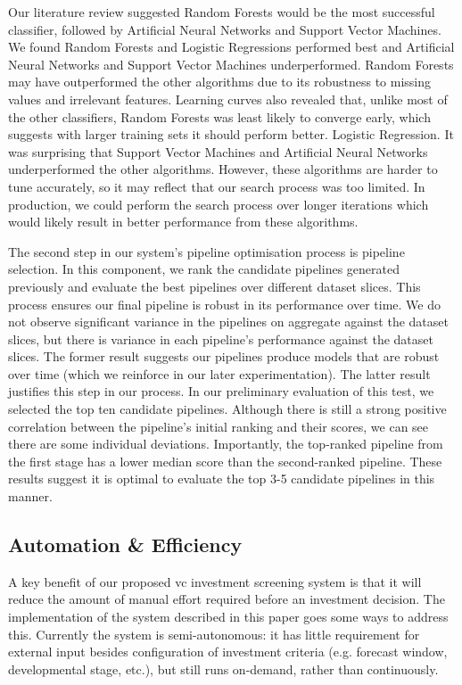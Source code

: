 \documentclass[../thesis/thesis.tex]{subfiles}
\begin{document}
Our literature review suggested Random Forests would be the most successful classifier, followed by Artificial Neural Networks and Support Vector Machines. We found Random Forests and Logistic Regressions performed best and Artificial Neural Networks and Support Vector Machines underperformed. Random Forests may have outperformed the other algorithms due to its robustness to missing values and irrelevant features. Learning curves also revealed that, unlike most of the other classifiers, Random Forests was least likely to converge early, which suggests with larger training sets it should perform better. Logistic Regression. It was surprising that Support Vector Machines and Artificial Neural Networks underperformed the other algorithms. However, these algorithms are harder to tune accurately, so it may reflect that our search process was too limited. In production, we could perform the search process over longer iterations which would likely result in better performance from these algorithms.

The second step in our system's pipeline optimisation process is pipeline selection. In this component, we rank the candidate pipelines generated previously and evaluate the best pipelines over different dataset slices. This process ensures our final pipeline is robust in its performance over time. We do not observe significant variance in the pipelines on aggregate against the dataset slices, but there is variance in each pipeline's performance against the dataset slices. The former result suggests our pipelines produce models that are robust over time (which we reinforce in our later experimentation). The latter result justifies this step in our process. In our preliminary evaluation of this test, we selected the top ten candidate pipelines. Although there is still a strong positive correlation between the pipeline's initial ranking and their scores, we can see there are some individual deviations. Importantly, the top-ranked pipeline from the first stage has a lower median score than the second-ranked pipeline. These results suggest it is optimal to evaluate the top 3-5 candidate pipelines in this manner.

\subsection{Automation \& Efficiency}

A key benefit of our proposed \gls{vc} investment screening system is that it will reduce the amount of manual effort required before an investment decision.  The implementation of the system described in this paper goes some ways to address this. Currently the system is semi-autonomous: it has little requirement for external input besides configuration of investment criteria (e.g. forecast window, developmental stage, etc.), but still runs on-demand, rather than continuously.
\end{document}
